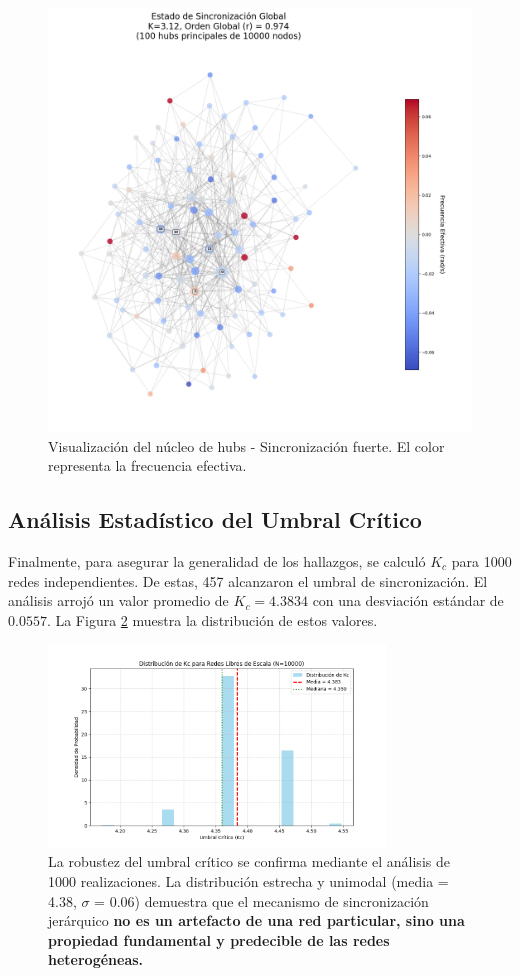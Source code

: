 \documentclass[12pt, a4paper]{article}
\begin{document}
\begin{figure}[htbp]
    \centering
    \includegraphics[width=\textwidth]{img/3_3.png}
    \caption{Visualización del núcleo de hubs - Sincronización fuerte. El color representa la frecuencia efectiva.}
    \label{fig:hubs_c}
\end{figure}


\subsection{Análisis Estadístico del Umbral Crítico}
Finalmente, para asegurar la generalidad de los hallazgos, se calculó \(K_c\) para 1000 redes independientes. De estas, 457 alcanzaron el umbral de sincronización. El análisis arrojó un valor promedio de \(K_c = 4.3834\) con una desviación estándar de \(0.0557\). La Figura \ref{fig:kc_hist} muestra la distribución de estos valores.

\begin{figure}[htbp]
    \centering
    \includegraphics[width=0.8\textwidth]{img/4_1.png}
    \caption{La robustez del umbral crítico se confirma mediante el análisis de 1000 realizaciones. La distribución estrecha y unimodal (media = 4.38, \(\sigma\) = 0.06) demuestra que el mecanismo de sincronización jerárquico \textbf{no es un artefacto de una red particular, sino una propiedad fundamental y predecible de las redes heterogéneas.}}
    \label{fig:kc_hist}
\end{figure}
\end{document}
